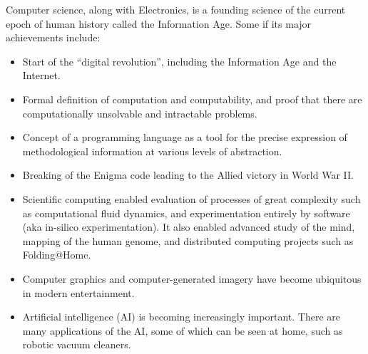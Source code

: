 \documentclass[8pt,a4paper,compress]{beamer}
\begin{document}
\begin{frame}[fragile]
\pause

Computer science, along with Electronics, is a founding science of the current epoch of human history called the Information Age. Some if its major achievements include:
\begin{itemize}
\pause
\item Start of the ``digital revolution'', including the Information Age and the Internet.
\pause
\item Formal definition of computation and computability, and proof that there are computationally unsolvable and intractable problems.
\pause
\item Concept of a programming language as a tool for the precise expression of methodological information at various levels of abstraction.
\pause
\item Breaking of the Enigma code leading to the Allied victory in World War II.
\pause
\item Scientific computing enabled evaluation of processes of great complexity such as computational fluid dynamics, and experimentation entirely by software (aka in-silico experimentation). It also enabled advanced study of the mind, mapping of the human genome, and distributed computing projects such as Folding@Home.
\pause
\item Computer graphics and computer-generated imagery have become ubiquitous in modern entertainment.
\pause
\item Artificial intelligence (AI) is becoming increasingly important. There are many applications of the AI, some of which can be seen at home, such as robotic vacuum cleaners.
\end{itemize}
\end{frame}
\end{document}
